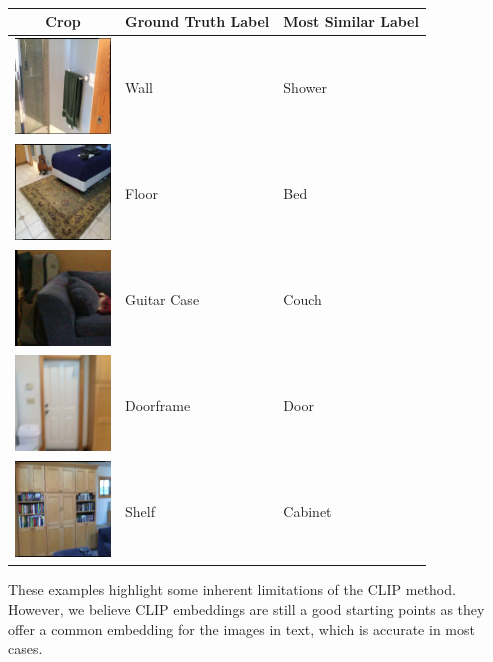 \begin{table}[h]
    \centering
    \caption{}
    \begin{tabular}{|c|l|l|}
        \hline
        \textbf{Crop} & \textbf{Ground Truth Label} & \textbf{Most Similar Label} \\ \hline
        \includegraphics[width=1in]{images/wall.png} & Wall & Shower \\ \hline
        \includegraphics[width=1in]{images/floor.png} & Floor & Bed \\ \hline
        \includegraphics[width=1in]{images/guitar case.png} & Guitar Case & Couch \\ \hline
        \includegraphics[width=1in]{images/doorframe.png} & Doorframe & Door \\ \hline
        \includegraphics[width=1in]{images/shelf.png} & Shelf & Cabinet \\ \hline
    \end{tabular}
\end{table}

These examples highlight some inherent limitations of the CLIP method. However, we believe CLIP embeddings are still a good starting points as they offer a common embedding for the images in text, which is accurate in most cases.


